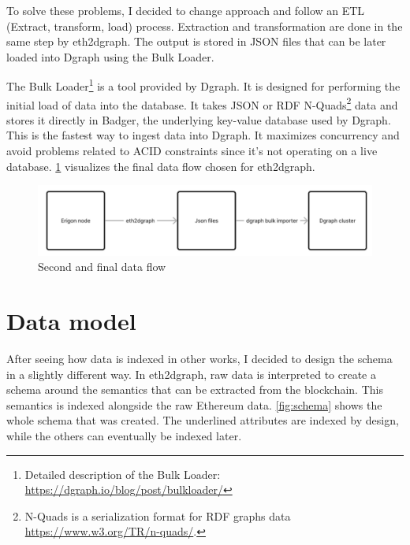 To solve these problems, I decided to change approach and follow an ETL (Extract, transform, load) process. Extraction and transformation are done in the same step by eth2dgraph. The output is stored in JSON files that can be later loaded into Dgraph using the Bulk Loader.

The Bulk Loader\footnote{Detailed description of the Bulk Loader: \url{https://dgraph.io/blog/post/bulkloader/}} is a tool provided by Dgraph. It is designed for performing the initial load of data into the database. It takes JSON or RDF N-Quads\footnote{N-Quads is a serialization format for RDF graphs data \url{https://www.w3.org/TR/n-quads/}.} data and stores it directly in Badger, the underlying key-value database used by Dgraph. This is the fastest way to ingest data into Dgraph. It maximizes concurrency and avoid problems related to ACID constraints since it's not operating on a live database. \cref{fig:data-flow-2} visualizes the final data flow chosen for eth2dgraph.

\begin{figure}[H]
  \centering
  \includegraphics[width=1\textwidth]{Figures/methods/data-flow-2.jpg}
  \caption[Second and final data flow]{Second and final data flow}
  \label{fig:data-flow-2}
\end{figure}

\section{Data model}

After seeing how data is indexed in other works, I decided to design the schema in a slightly different way. In eth2dgraph, raw data is interpreted to create a schema around the semantics that can be extracted from the blockchain. This semantics is indexed alongside the raw Ethereum data. \cref{fig:schema} shows the whole schema that was created. The underlined attributes are indexed by design, while the others can eventually be indexed later. 


